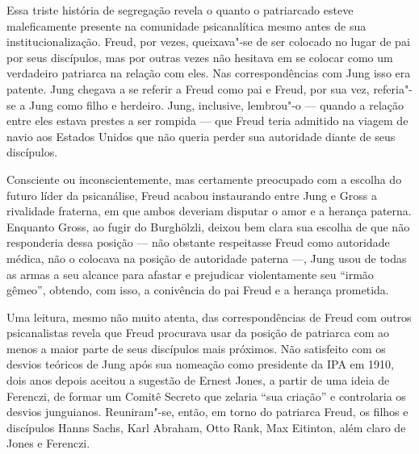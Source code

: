 Essa triste história de segregação revela o quanto o patriarcado esteve
maleficamente presente na comunidade psicanalítica mesmo antes de sua
institucionalização. Freud, por vezes, queixava"-se de ser colocado no
lugar de pai por seus discípulos, mas por outras vezes não hesitava em
se colocar como um verdadeiro patriarca na relação com eles. Nas
correspondências com Jung isso era patente. Jung chegava a se referir a
Freud como pai e Freud, por sua vez, referia"-se a Jung como filho e
herdeiro. Jung, inclusive, lembrou"-o --- quando a relação entre eles
estava prestes a ser rompida --- que Freud teria admitido na viagem de
navio aos Estados Unidos que não queria perder sua autoridade diante de
seus discípulos.

Consciente ou inconscientemente, mas certamente preocupado com a escolha
do futuro líder da psicanálise, Freud acabou instaurando entre Jung e
Gross a rivalidade fraterna, em que ambos deveriam disputar o amor e a
herança paterna. Enquanto Gross, ao fugir do Burghölzli, deixou bem
clara sua escolha de que não responderia dessa posição --- não obstante
respeitasse Freud como autoridade médica, não o colocava na posição de
autoridade paterna ---, Jung usou de todas as armas a seu alcance para
afastar e prejudicar violentamente seu ``irmão gêmeo'', obtendo, com
isso, a conivência do pai Freud e a herança prometida.

Uma leitura, mesmo não muito atenta, das correspondências de Freud com
outros psicanalistas revela que Freud procurava usar da posição de
patriarca com ao menos a maior parte de seus discípulos mais próximos.
Não satisfeito com os desvios teóricos de Jung após sua nomeação como
presidente da IPA em 1910, dois anos depois aceitou a sugestão de Ernest
Jones, a partir de uma ideia de Ferenczi, de formar um Comitê Secreto
que zelaria ``sua criação'' e controlaria os desvios junguianos.
Reuniram"-se, então, em torno do patriarca Freud, os filhos e discípulos
Hanns Sachs, Karl Abraham, Otto Rank, Max Eitinton, além claro de Jones
e Ferenczi.

